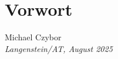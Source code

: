 \documentclass[11pt, a5paper, twoside, openright]{book}
\begin{document}
\chapter*{Vorwort}

\begin{flushright}
    Michael Czybor \\
    \emph{Langenstein/AT, August 2025}
\end{flushright}

\tableofcontents
\listoffigures
\listoftables

\mainmatter


\appendix


\backmatter
\printbibliography[title=Literaturverzeichnis]
\glswritefiles
\printglossary[title=Glossar]
\printglossary[type=acronym, title=Abkürzungen]
\end{document}
